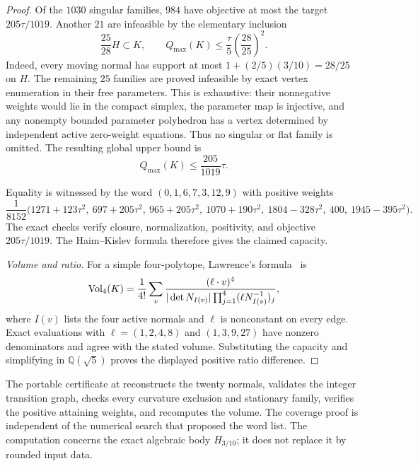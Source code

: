 \begin{proof}
Of the $1030$ singular families, $984$ have objective at most the target
$205\tau/1019$. Another $21$ are infeasible by the elementary inclusion
\[
 \frac{25}{28}H\subset K,
 \qquad Q_{\max}(K)\leq\frac\tau5\left(\frac{28}{25}\right)^2.
\]
Indeed, every moving normal has support at most
$1+(2/5)(3/10)=28/25$ on $H$.
The remaining $25$ families are proved infeasible by exact vertex enumeration
in their free parameters. This is exhaustive: their nonnegative weights
would lie in the compact simplex, the parameter map is injective, and any
nonempty bounded parameter polyhedron has a vertex determined by independent
active zero-weight equations. Thus no singular or flat family is omitted.
The resulting global upper bound is
\[
 Q_{\max}(K)\leq\frac{205}{1019}\tau.
\]

Equality is witnessed by the word $(0,1,6,7,3,12,9)$ with positive weights
\[
 \frac1{8152}\bigl(
 1271+123\tau^2,\ 697+205\tau^2,\ 965+205\tau^2,\
 1070+190\tau^2,\ 1804-328\tau^2,\ 400,\
 1945-395\tau^2\bigr).
\]
The exact checks verify closure, normalization, positivity, and objective
$205\tau/1019$. The Haim--Kislev formula therefore gives the claimed capacity.

\emph{Volume and ratio.}
For a simple four-polytope, Lawrence's formula~\cite{Lawrence1991} is
\[
 \operatorname{Vol}_4(K)=\frac1{4!}\sum_v
 \frac{(\ell\cdot v)^4}
 {|\det N_{I(v)}|\prod_{j=1}^4(\ell N_{I(v)}^{-1})_j},
\]
where $I(v)$ lists the four active normals and $\ell$ is nonconstant on every
edge. Exact evaluations with $\ell=(1,2,4,8)$ and $(1,3,9,27)$ have nonzero
denominators and agree with the stated volume. Substituting the capacity
and simplifying in $\mathbb Q(\sqrt5)$ proves the displayed positive ratio
difference.
\end{proof}

The portable certificate at 
reconstructs the twenty normals, validates the
integer transition graph, checks every curvature exclusion and stationary
family, verifies the positive attaining weights, and recomputes the volume.
The coverage proof is independent of the numerical search that proposed the
word list. The computation concerns the exact algebraic body $H_{3/10}$;
it does not replace it by rounded input data.
